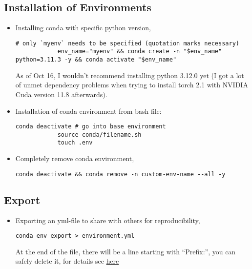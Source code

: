 \documentclass[12pt, a4paper]{article}
\numberwithin{equation}{section}
\theoremstyle{definition}
\theoremstyle{definition}
\begin{document}
	\subsection{Installation of Environments}
	
	\begin{itemize}
		\item Installing conda with specific python version,
		
		\begin{lstlisting}[style=mystylebash, label=alg:conda_env__creation_activation, xleftmargin=\parindent]
			# only `myenv` needs to be specified (quotation marks necessary)
			env_name="myenv" && conda create -n "$env_name" python=3.11.3 -y && conda activate "$env_name"
		\end{lstlisting} 
	
		As of Oct 16, I wouldn't recommend installing python 3.12.0 yet (I got a lot of unmet dependency problems when trying to install torch 2.1 with NVIDIA Cuda version 11.8 afterwards). 
		
		\item Installation of conda environment from bash file: 
		
		\begin{lstlisting}[style=mystylepython, label=alg:conda_env__from_bash, xleftmargin=\parindent]
			conda deactivate # go into base environment
			source conda/filename.sh
			touch .env 
		\end{lstlisting}
		
		\item Completely remove conda environment, 
		
		\begin{lstlisting}[style=mystylebash, label=alg:conda_removal, xleftmargin=\parindent]
			conda deactivate && conda remove -n custom-env-name --all -y 
		\end{lstlisting}
	
	\end{itemize} 

	\subsection{Export}
	
	\begin{itemize}
		\item Exporting an yml-file to share with others for reproducibility,
		
		\begin{lstlisting}[style=mystylebash, label=alg:conda_export, xleftmargin=\parindent]
			conda env export > environment.yml
		\end{lstlisting}
		
		At the end of the file, there will be a line starting with \enquote{Prefix:}, you can safely delete it, for details see \href{https://stackoverflow.com/questions/39280638/how-to-share-conda-environments-across-platforms}{here}
	\end{itemize}
	
\end{document}
